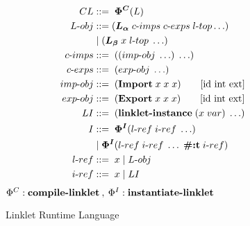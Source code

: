 \documentclass[sigplan,screen,anonymous]{acmart}
\def\dash {\text{-}}
\begin{document}
\def\la {\bm{L_\alpha}}
\def\lb {\bm{L_\beta}}
\def\lc {\bm{L_\gamma}}



\begin{figure}[tbp]
  \begin{align*}
    CL             &::=\; \bm{\Phi^C}(L)\\
    L\dash obj     &::= (\la\; c\dash imps \; c\dash exps \; l\dash top \ldots)\\
    \;           &\;|\; (\lb\; x\; l\dash top\; \ldots) \\
    c\dash imps    &::=\; ((imp\dash obj\; \ldots)\; \ldots)\\
    c\dash exps    &::=\; (exp\dash obj\; \ldots)\\
    imp\dash obj   &::=\; (\textbf{Import}\; x\; x\; x) \tag*{[id int ext]} \\
    exp\dash obj   &::=\; (\textbf{Export}\; x\; x\; x) \tag*{[id int ext]} \\
    LI             &::=\; (\textbf{linklet\dash instance}\; (x\; var)\; \ldots) \\
    I              &::=\; \bm{\Phi^I}(l\dash ref\; i\dash ref\; \ldots) \\
    \;           &\;|\; \bm{\Phi^I}(l\dash ref\; i\dash ref\; \ldots\; \textbf{\#:t}\; i\dash ref) \\
    l\dash ref &::=\; x\; |\; L\dash obj \\
    i\dash ref  &::=\; x\; |\; LI \\
  \end{align*}
  \hfill \footnotesize $\Phi^C : \textbf{compile\dash linklet}\:,\: \Phi^I : \textbf{instantiate\dash linklet}$
\caption{Linklet Runtime Language}
\label{fig:linklet-runtime}
\end{figure}
\end{document}
